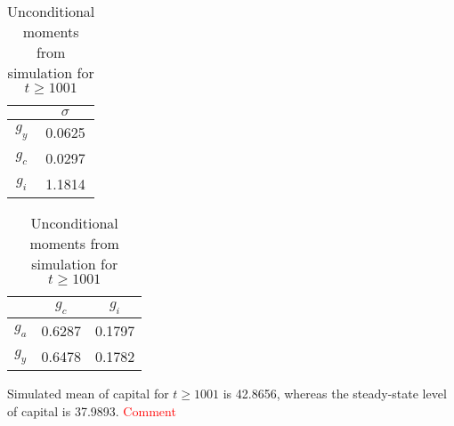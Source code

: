 \documentclass[]{article}
\begin{document}
\begin{table}[!htb]
	\centering
	\begin{minipage}{0.49\textwidth}
		\centering
		\begin{tabular}{c|c}
			 & $\sigma$ \\ \hline
			$g_y$ & 0.0625 \\
			$g_c$ & 0.0297 \\
			$g_i$ & 1.1814
		\end{tabular}
		\label{tab:ex2std}
	\end{minipage}
	\begin{minipage}{0.49\textwidth}
		\centering
		\begin{tabular}{c|cc}
			 & $g_c$ & $g_i$ \\ \hline
			$g_a$ & 0.6287 & 0.1797 \\
			$g_y$ & 0.6478 & 0.1782
		\end{tabular}
		\label{tab:ex2corr}
	\end{minipage}
	\caption{Unconditional moments from simulation for $t\geq1001$}
\end{table}

Simulated mean of capital for $t\geq1001$ is 42.8656, whereas the steady-state level of capital is 37.9893.
\textcolor{red}{Comment}
\end{document}
